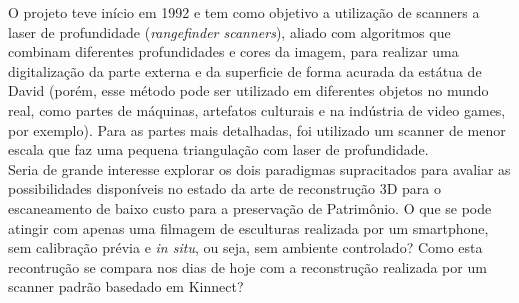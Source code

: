 O projeto teve início em 1992 e tem como objetivo a utilização de scanners a laser de profundidade
({\it rangefinder scanners}), aliado com algoritmos que combinam diferentes profundidades e cores da imagem, 
para realizar uma digitalização da parte externa e da superficie de forma acurada da estátua de David 
(porém, esse método pode ser utilizado em diferentes objetos no mundo real, 
como partes de máquinas, artefatos culturais e na indústria de video games, por exemplo). 
Para as partes mais detalhadas, foi utilizado um scanner de menor escala que faz uma pequena 
triangulação com laser de profundidade.\\


Seria de grande interesse explorar os dois paradigmas supracitados
para avaliar as possibilidades disponíveis no estado da arte de reconstrução 3D
para o escaneamento de baixo custo para a preservação de Patrimônio. O que se
pode atingir com apenas uma filmagem de esculturas realizada por um smartphone,
sem calibração prévia e \emph{in situ}, ou seja, sem ambiente controlado?  Como
esta recontrução se compara nos dias de hoje com a reconstrução realizada por um
scanner padrão basedado em Kinnect?

